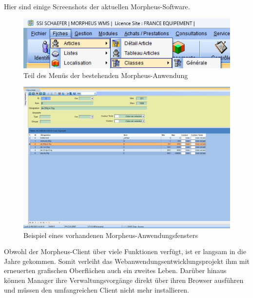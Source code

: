 \documentclass[a4paper, 12pt, french]{article}
\begin{document}
		\noindent Hier sind einige Screenshots der aktuellen Morpheus-Software.


				\begin{figure}[ht!]
					\begin{center}
						\includegraphics[width=0.9\linewidth]{images/mph_menu.png}
					\end{center}
					\caption{Teil des Menüs der bestehenden Morpheus-Anwendung}
					\label{fig:mph_menu}
				\end{figure}

\newpage

				\begin{figure}[ht!]
					\begin{center}
						\includegraphics[width=\linewidth]{images/mph_window.png}
					\end{center}
					\caption{Beispiel eines vorhandenen Morpheus-Anwendungsfensters}
					\label{fig:mph_window}
				\end{figure}

				Obwohl der Morpheus-Client über viele Funktionen verfügt, ist er langsam in die Jahre gekommen. Somit verleiht das Webanwendungsentwicklungsprojekt ihm mit erneuerten grafischen Oberflächen auch ein zweites Leben. Darüber hinaus können Manager ihre Verwaltungsvorgänge direkt über ihren Browser ausführen und müssen den umfangreichen Client nicht mehr installieren.
				
\end{document}
